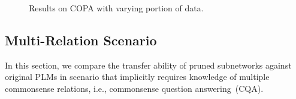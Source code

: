 %		
%		
%		
\begin{figure}[t!]
	\centering
	\caption{Results on COPA with varying portion of data.} \label{fig:copa}
\end{figure}

\subsection{Multi-Relation Scenario}
\label{sec:csr}
In this section, we compare the transfer ability of pruned subnetworks against original PLMs in scenario that implicitly requires knowledge of multiple commonsense relations, i.e., commonsense question answering~(CQA).

